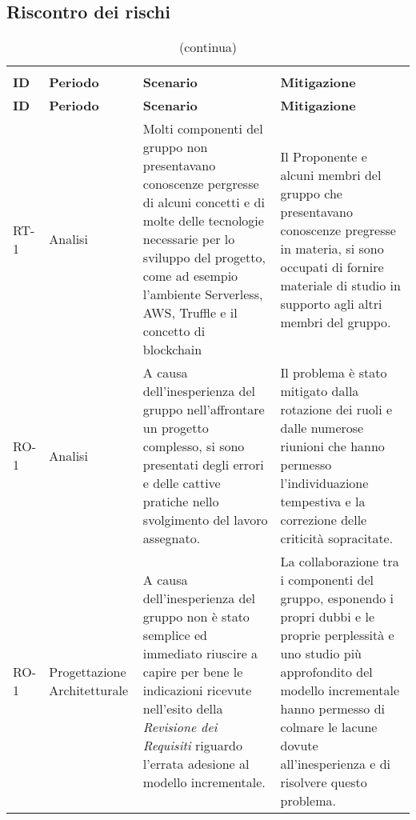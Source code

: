 \begin{appendices}
\section{Riscontro dei rischi}
	\begin{longtable}{
		>{\centering}p{}
		>{\centering}p{}
		>{\centering\arraybackslash}p{}
		>{\centering\arraybackslash}p{} }

		\rowcolor{white}\caption {Riscontro dei rischi} \\

		\textbf{\color{white}ID} &
		\textbf{\color{white}Periodo} &
		\textbf{\color{white}Scenario} &
		\textbf{\color{white}Mitigazione}
		\endfirsthead
		
		\rowcolor{white}\caption[]{(continua)}\\
		\textbf{\color{white}ID} &
		\textbf{\color{white}Periodo} &
		\textbf{\color{white}Scenario} &
		\textbf{\color{white}Mitigazione}
		\endhead
		
		\hline \multicolumn{4}{c}{\textit{Continua nella prossima pagina}} \\
		\endfoot
		\hline
		\endlastfoot

		RT-1
		&
		Analisi
		&
		Molti componenti del gruppo \Gruppo{} non presentavano conoscenze pergresse di alcuni concetti e di molte delle tecnologie necessarie per lo sviluppo del progetto, come ad esempio l'ambiente Serverless\ped{\textit{G}}, AWS\ped{\textit{G}}, Truffle\ped{\textit{G}} e il concetto di blockchain\ped{\textit{G}}
		&
		Il Proponente\ped{\textit{G}} e alcuni membri del gruppo che presentavano conoscenze pregresse in materia, si sono occupati di fornire materiale di studio in supporto agli altri membri del gruppo.\\

		RO-1
		&
		Analisi
		&
		A causa dell'inesperienza del gruppo nell'affrontare un progetto complesso, si sono presentati degli errori e delle cattive pratiche nello svolgimento del lavoro assegnato.
		&
		Il problema è stato mitigato dalla rotazione dei ruoli e dalle numerose riunioni che hanno permesso l'individuazione tempestiva e la correzione delle criticità sopracitate.\\
		
		RO-1
		&
		Progettazione Architetturale
		&
		A causa dell'inesperienza del gruppo non è stato semplice ed immediato riuscire a capire per bene le indicazioni ricevute nell'esito della \textit{Revisione dei Requisiti} riguardo l'errata adesione al modello incrementale.
		&
		La collaborazione tra i componenti del gruppo, esponendo i propri dubbi e le proprie perplessità e uno studio più approfondito del modello incrementale hanno permesso di colmare le lacune dovute all'inesperienza e di risolvere questo problema.\\
		

\end{longtable}
\end{appendices}
